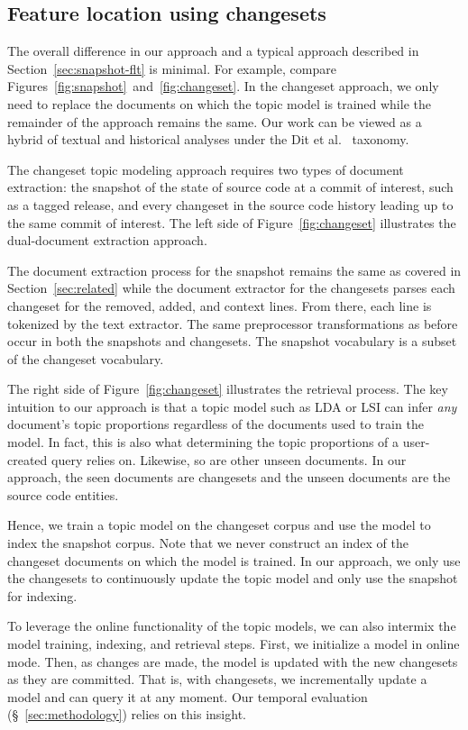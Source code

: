\subsection{Feature location using changesets}

The overall difference in our approach and a typical approach described in Section~\ref{sec:snapshot-flt} is minimal.
For example, compare Figures~\ref{fig:snapshot}~and~\ref{fig:changeset}.
In the changeset approach, we only need to replace the documents on which the topic model is trained
while the remainder of the approach remains the same.
Our work can be viewed as a hybrid of textual and historical analyses
under the Dit et al.~\cite{Dit-etal:2011} taxonomy.


The changeset topic modeling approach requires two types of document extraction:
the snapshot of the state of source code at a commit of interest, such as
a tagged release, and every changeset in the source code history leading up to
the same commit of interest.  The left side of Figure~\ref{fig:changeset}
illustrates the dual-document extraction approach.

The document extraction process for the snapshot remains the same as covered in
Section~\ref{sec:related} while the document extractor for the changesets parses
each changeset for the removed, added, and context lines.  From there, each line
is tokenized by the text extractor.  The same preprocessor transformations as
before occur in both the snapshots and changesets.  The snapshot vocabulary is
a subset of the changeset vocabulary.

The right side of Figure~\ref{fig:changeset} illustrates the retrieval process.
The key intuition to our approach is that a topic model such as LDA or LSI can
infer \emph{any} document's topic proportions regardless of the documents used
to train the model.  In fact, this is also what determining the topic
proportions of a user-created query relies on. Likewise, so are other unseen
documents. In our approach, the seen documents are changesets and the unseen
documents are the source code entities.

Hence, we train a topic model on the changeset corpus and use the model to index
the snapshot corpus.  Note that we never construct an index of the changeset
documents on which the model is trained.  In our approach, we only use the
changesets to continuously update the topic model and only use the snapshot for
indexing.

To leverage the online functionality of the topic models, we can also intermix
the model training, indexing, and retrieval steps.  First, we initialize a model
in online mode.  Then, as changes are made, the model is updated with the new
changesets as they are committed.  That is, with changesets, we incrementally
update a model and can query it at any moment.  Our temporal evaluation
(\S~\ref{sec:methodology}) relies on this insight.

